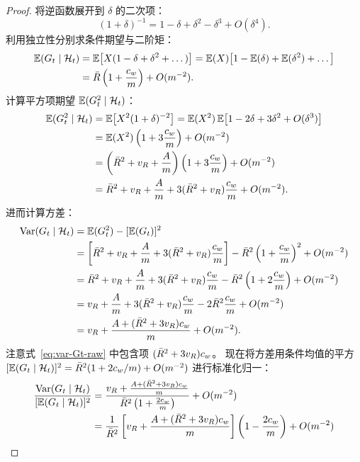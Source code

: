 \begin{proof}
将逆函数展开到 $\delta$ 的二次项：
\begin{equation}
  (1 + \delta)^{-1} = 1 - \delta + \delta^2 - \delta^3 + O(\delta^4).
\end{equation}
利用独立性分别求条件期望与二阶矩：
\begin{align}
  \mathbb{E}(G_t \mid \mathcal{H}_t) &= \mathbb{E}\big[ X (1 - \delta + \delta^2 + \dots) \big] = \mathbb{E}(X) \big[ 1 - \mathbb{E}(\delta) + \mathbb{E}(\delta^2) + \dots \big] \nonumber \\
  &= \bar{R} \left( 1 + \frac{c_w}{m} \right) + O(m^{-2}).
\end{align}
计算平方项期望 $\mathbb{E}(G_t^2 \mid \mathcal{H}_t)$：
\begin{align}
  \mathbb{E}(G_t^2 \mid \mathcal{H}_t) &= \mathbb{E}\big[ X^2 (1 + \delta)^{-2} \big] = \mathbb{E}(X^2) \, \mathbb{E}\big[ 1 - 2\delta + 3\delta^2 + O(\delta^3) \big] \nonumber \\
  &= \mathbb{E}(X^2) \left( 1 + 3\frac{c_w}{m} \right) + O(m^{-2}) \nonumber \\
  &= \left( \bar{R}^2 + v_R + \frac{A}{m} \right) \left( 1 + 3\frac{c_w}{m} \right) + O(m^{-2}) \nonumber \\
  &= \bar{R}^2 + v_R + \frac{A}{m} + 3(\bar{R}^2 + v_R)\frac{c_w}{m} + O(m^{-2}).
\end{align}
进而计算方差：
\begin{align}
  \mathrm{Var}(G_t \mid \mathcal{H}_t) &= \mathbb{E}(G_t^2) - [\mathbb{E}(G_t)]^2 \nonumber \\
  &= \left[ \bar{R}^2 + v_R + \frac{A}{m} + 3(\bar{R}^2 + v_R)\frac{c_w}{m} \right] - \bar{R}^2 \left( 1 + \frac{c_w}{m} \right)^2 + O(m^{-2}) \nonumber \\
  &= \bar{R}^2 + v_R + \frac{A}{m} + 3(\bar{R}^2 + v_R)\frac{c_w}{m} - \bar{R}^2 \left( 1 + 2\frac{c_w}{m} \right) + O(m^{-2}) \nonumber \\
  &= v_R + \frac{A}{m} + 3(\bar{R}^2 + v_R)\frac{c_w}{m} - 2\bar{R}^2\frac{c_w}{m} + O(m^{-2}) \nonumber \\
  &= v_R + \frac{A + (\bar{R}^2 + 3v_R)c_w}{m} + O(m^{-2}).
  \label{eq:var-Gt-raw}
\end{align}
注意式~\eqref{eq:var-Gt-raw} 中包含项 $(\bar{R}^2 + 3v_R)c_w$。
现在将方差用条件均值的平方 $[\mathbb{E}(G_t \mid \mathcal{H}_t)]^2 = \bar{R}^2(1 + 2c_w/m) + O(m^{-2})$ 进行标准化归一：
\begin{align}
  \frac{\Var(G_t \mid \mathcal{H}_t)}{[\E(G_t \mid \mathcal{H}_t)]^2} &= \frac{v_R + \frac{A + (\Rbar^2 + 3v_R)c_w}{m}}{\Rbar^2 \left( 1 + \frac{2c_w}{m} \right)} + O(m^{-2}) \nonumber \\
  &= \frac{1}{\Rbar^2} \left[ v_R + \frac{A + (\Rbar^2 + 3v_R)c_w}{m} \right] \left( 1 - \frac{2c_w}{m} \right) + O(m^{-2}) \nonumber \\

\end{align}
\end{proof}
